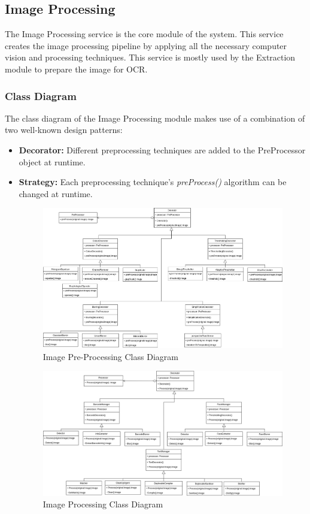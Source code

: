 \documentclass{article}
\begin{document}
\subsection{Image Processing}
The Image Processing service is the core module of the system. This service creates the image processing pipeline by applying all the necessary computer vision and processing techniques. This service is mostly used by the Extraction module to prepare the image for OCR. 
\subsubsection{Class Diagram}
The class diagram of the Image Processing module makes use of a combination of two well-known design patterns: 
\begin{itemize}
	\item \textbf{Decorator:} Different preprocessing techniques are added to the PreProcessor object at runtime.
	\item \textbf{Strategy:} Each preprocessing technique's \textit{preProcess()} algorithm can be changed at runtime.
	\begin{figure}[!h]
	    \centering
	    \includegraphics[scale=0.3]{img/imageProcessingClassDiagram.png}
	    \caption{Image Pre-Processing Class Diagram}
	 \end{figure}
	   \pagebreak
	 \begin{figure}[!h]
		\centering
	    \includegraphics[scale=0.3]{img/processingClassDiagram.png}
	    \caption{Image Processing Class Diagram}
	 \end{figure}
\end{itemize}
\pagebreak
\end{document}
